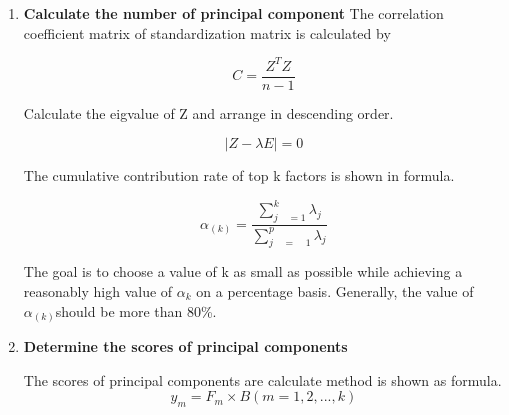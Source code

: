 \documentclass{mcmthesis}
\begin{document}
\begin{enumerate}
          \item \textbf{Calculate the number of principal component}
          The correlation coefficient matrix of standardization matrix is calculated by
          \begin{table}[!hbpt]
               \centering
               $$ C=\frac { { Z }^{ T }Z }{ n-1 }  $$
          \end{table}
          Calculate the eigvalue of Z and arrange in descending order.
          \begin{table}[!hbpt]
               \centering
               $$ |Z - \lambda E| = 0  $$
          \end{table}
          The cumulative contribution rate of top k factors is shown in formula.
          \begin{table}[!hbpt]
               \centering
               $$ { \alpha  }_{ (k) }=\frac { \sum _{ j\quad = 1 }^{ k }{ { \lambda  }_{ j } }  }{ \sum _{ j\quad =\quad 1 }^{ p }{ { \lambda  }_{ j } }  }   $$
          \end{table}
          The goal is to choose a value of k as small as possible while achieving a reasonably high value of ${\alpha}_{k}$ on a percentage basis. Generally, the value of $\alpha_{(k)}$should be more than 80\%.

          \item \textbf{Determine the scores of  principal components}

          The scores of principal components are calculate method is shown as formula.
               $$ y_m = F_m \times B (m=1,2,...,k)  $$

\end{enumerate}
\end{document}
